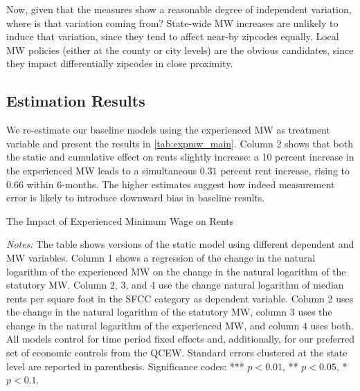 Now, given that the measures show a reasonable degree of independent variation, where is that
variation coming from? State-wide MW increases are unlikely to induce that variation, since 
they tend to affect near-by zipcodes equally. Local MW policies (either at the county or city
levels) are the obvious candidates, since they impact differentially zipcodes in close 
proximity. 

\subsection{Estimation Results}

We re-estimate our baseline models using the experienced MW as treatment variable and present 
the results in \autoref{tab:expmw_main}. Column 2 shows that both the static and cumulative 
effect on rents slightly increase: a 10 percent increase in the experienced MW leads to a simultaneous
$0.31$ percent rent increase, rising to $0.66$ within 6-months. The higher estimates suggest how 
indeed measurement error is likely to introduce downward bias in baseline results.



\begin{table}[h!]\centering
	\caption{The Impact of Experienced Minimum Wage on Rents}
	\label{tab:expmw_main}
	
	\begin{minipage}{0.95\textwidth}\footnotesize
		\vspace{3mm}	
		\textit{Notes:} The table shows versions of the static model using different dependent and 
		MW variables. Column 1 shows a regression of the change in the natural logarithm of the 
		experienced MW on the change in the natural logarithm of the statutory MW. Column 2, 3, and 4
		use the change natural logarithm of median rents per square foot in the SFCC category as 
		dependent variable. Column 2 uses the change in the natural logarithm of the statutory MW, 
		column 3 uses the change in the natural logarithm of the experienced MW, and column 4 uses both.
		All models control for time period fixed effects and, additionally, for our preferred set of 
		economic controls from the QCEW. 
		Standard errors clustered at the state level are reported in parenthesis. Significance codes: 
		*** $p < 0.01$, ** $p < 0.05$, * $p < 0.1$.
	\end{minipage}
\end{table}



